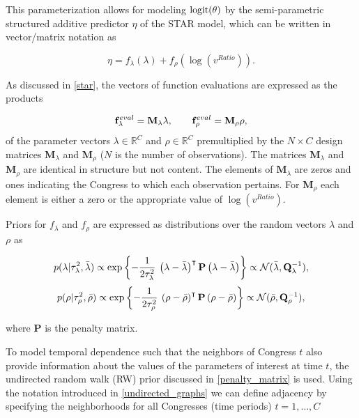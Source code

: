 This parameterization allows for modeling ${\rm logit}(\theta)$ by the semi-parametric structured 
additive predictor $\eta$ of the STAR model, which can be written in vector/matrix notation 
as 

\begin{equation*}
 \eta = f_\lambda(\lambda) +  f_\rho(\log{(v^{Ratio})}). 
\end{equation*}

\noindent As discussed in \ref{star}, the vectors of function evaluations are expressed as the products 

\begin{equation*}
\mathbf{f}^{eval}_\lambda = \mathbf{M}_\lambda \lambda, 
\qquad 
\mathbf{f}^{eval}_\rho =  \mathbf{M}_\rho \rho, 
\end{equation*}
%
\noindent of the parameter vectors $\lambda \in \mathbb{R}^C$ and $\rho \in \mathbb{R}^C$ 
premultiplied by the $N \times C$ design matrices  $\mathbf{M}_\lambda$ and  $\mathbf{M}_\rho$ 
($N$ is the number of observations). The matrices $\mathbf{M}_\lambda$ and $\mathbf{M}_\rho$ 
are identical in structure but not content. The elements of $\mathbf{M}_\lambda$ are zeros and ones 
indicating the Congress to which each observation pertains. For $\mathbf{M}_\rho$ each element is 
either a zero or the appropriate value of $\log{(v^{Ratio})}$. 


Priors for $f_{\lambda}$ and $f_{\rho}$ are expressed as distributions over the random 
vectors $\lambda$ and $\rho$ as 

\begin{equation*}
p(\lambda | \tau_\lambda^2, \bar{\lambda}) \propto \exp{\left\{-\frac{1}{2\tau_\lambda^2} \: \left(\lambda - \bar{\lambda}\right)^\intercal  \mathbf{P}   \left(\lambda - \bar{\lambda}\right) \right\}} \propto \mathcal{N} (\bar{\lambda}, \mathbf{Q}_\lambda^{-1}), 
\end{equation*}
\begin{equation*}
p(\rho | \tau_\rho^2, \bar{\rho}) \propto \exp{\left\{-\frac{1}{2\tau_\rho^2} \: \left(\rho - \bar{\rho}\right)^\intercal  \mathbf{P} \left(\rho-\bar{\rho}\right) \right\}} \propto \mathcal{N} (\bar{\rho}, \mathbf{Q}_\rho^{-1}), 
\end{equation*}

\noindent where $\mathbf{P}$ is the penalty matrix.

To model temporal dependence such that the neighbors of Congress $t$ also provide information
about the values of the parameters of interest at time $t$, the undirected random walk (RW) 
prior discussed in \ref{penalty_matrix} is used. Using the notation introduced in \ref{undirected_graphs} 
we can define adjacency by specifying the neighborhoods for all Congresses (time periods) 
$t = 1, \dots, C$

